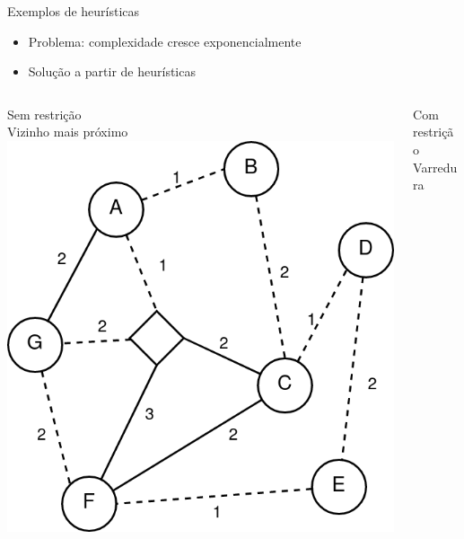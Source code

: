 \documentclass{beamer}
\begin{document}
\begin{frame}{Exemplos de heurísticas}
\begin{itemize}
        \item Problema: complexidade cresce exponencialmente
        \item Solução a partir de heurísticas
    \end{itemize}
\begin{columns} 
    \begin{column}{.5\textwidth}
    \begin{center}
    Sem restrição\\
    Vizinho mais próximo
    \includegraphics[scale=0.20]{assets/Roteirizacao/vp5.drawio.png}
    \end{center}
    \end{column}
    \begin{column}{.5\textwidth}
    \begin{center}
    Com restrição\\
    Varredura

\end{center}
\end{column}
\end{columns}
\end{frame}
\end{document}
